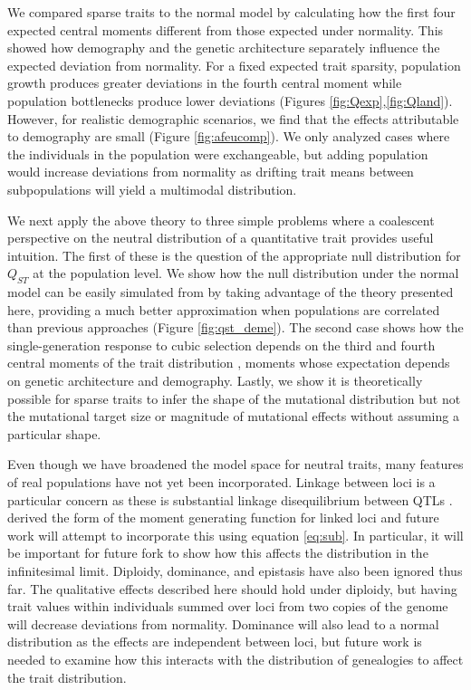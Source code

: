We compared sparse traits to the normal model by calculating how the first four
expected central moments different from those expected under normality. This
showed how demography and the genetic architecture separately influence the
expected deviation from normality. For a fixed expected trait sparsity,
population growth produces greater deviations in the fourth central moment while
population bottlenecks produce lower deviations (Figures
\ref{fig:Qexp},\ref{fig:Qland}). However, for realistic demographic scenarios,
we find that the effects attributable to demography are small (Figure
\ref{fig:afeucomp}). We only analyzed cases where the individuals in the
population were exchangeable, but adding population would increase deviations
from normality as drifting trait means between subpopulations will yield a
multimodal distribution.

We next apply the above theory to three simple problems where a coalescent
perspective on the neutral distribution of a quantitative trait provides useful
intuition. The first of these is the question of the appropriate null
distribution for $Q_{ST}$ at the population level. We show how the null
distribution under the normal model can be easily simulated from by taking
advantage of the theory presented here, providing a much better approximation
when populations are correlated than previous approaches \citep{Whitlock2009}
(Figure \ref{fig:qst_deme}). The second case shows how the single-generation
response to cubic selection depends on the third and fourth central moments of
the trait distribution \citep{Turelli1990}, moments whose expectation depends on
genetic architecture and demography. Lastly, we show it is theoretically
possible for sparse traits to infer the shape of the mutational distribution but
not the mutational target size or magnitude of mutational effects without
assuming a particular shape.

Even though we have broadened the model space for neutral traits, many features
of real populations have not yet been incorporated. Linkage between loci is a
particular concern as these is substantial linkage disequilibrium between QTLs
\citep{Bulik-Sullivan2015}. \citet{Lohse2011} derived the form of the moment
generating function for linked loci and future work will attempt to incorporate
this using equation \eqref{eq:sub}. In particular, it will be important for
future fork to show how this affects the distribution in the infinitesimal
limit. Diploidy, dominance, and epistasis have also been ignored thus far. The
qualitative effects described here should hold under diploidy, but having trait
values within individuals summed over loci from two copies of the genome will
decrease deviations from normality. Dominance will also lead to a normal
distribution as the effects are independent between loci, but future work is
needed to examine how this interacts with the distribution of genealogies to
affect the trait distribution.

